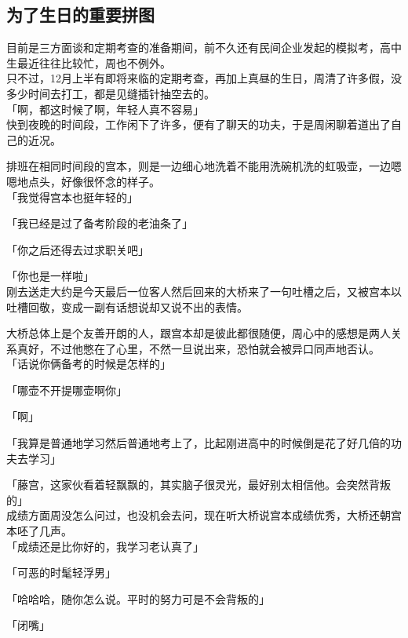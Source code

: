 \subsection{为了生日的重要拼图}

目前是三方面谈和定期考查的准备期间，前不久还有民间企业发起的模拟考，高中生最近往往比较忙，周也不例外。\\

只不过，12月上半有即将来临的定期考查，再加上真昼的生日，周清了许多假，没多少时间去打工，都是见缝插针抽空去的。\\

「啊，都这时候了啊，年轻人真不容易」\\

快到夜晚的时间段，工作闲下了许多，便有了聊天的功夫，于是周闲聊着道出了自己的近况。

排班在相同时间段的宫本，则是一边细心地洗着不能用洗碗机洗的虹吸壶，一边嗯嗯地点头，好像很怀念的样子。\\

「我觉得宫本也挺年轻的」

「我已经是过了备考阶段的老油条了」

「你之后还得去过求职关吧」

「你也是一样啦」\\

刚去送走大约是今天最后一位客人然后回来的大桥来了一句吐槽之后，又被宫本以吐槽回敬，变成一副有话想说却又说不出的表情。

大桥总体上是个友善开朗的人，跟宫本却是彼此都很随便，周心中的感想是两人关系真好，不过他憋在了心里，不然一旦说出来，恐怕就会被异口同声地否认。\\

「话说你俩备考的时候是怎样的」

「哪壶不开提哪壶啊你」

「啊」

「我算是普通地学习然后普通地考上了，比起刚进高中的时候倒是花了好几倍的功夫去学习」

「藤宫，这家伙看着轻飘飘的，其实脑子很灵光，最好别太相信他。会突然背叛的」\\

成绩方面周没怎么问过，也没机会去问，现在听大桥说宫本成绩优秀，大桥还朝宫本呸了几声。\\

「成绩还是比你好的，我学习老认真了」

「可恶的时髦轻浮男」

「哈哈哈，随你怎么说。平时的努力可是不会背叛的」

「闭嘴」\\

